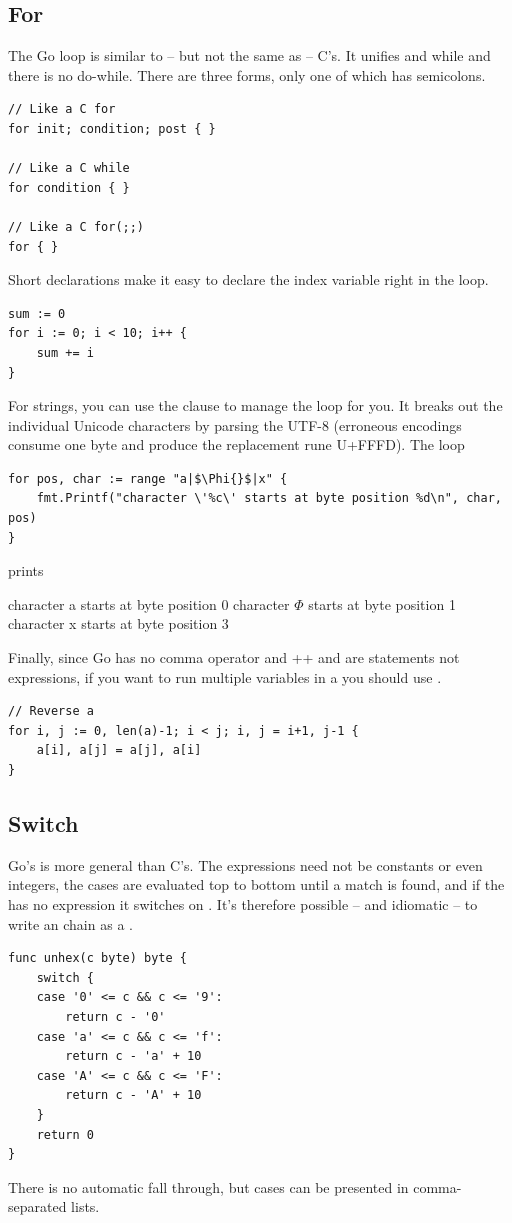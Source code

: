 \subsection{For}
The Go  loop is similar to -- but not the same as -- C's. It
unifies 
and while and there is no do-while. There are three forms, only one of
which has semicolons.
\begin{lstlisting}
// Like a C for
for init; condition; post { }

// Like a C while
for condition { }

// Like a C for(;;)
for { }
\end{lstlisting}
Short declarations make it easy to declare the index variable right in the loop.
\begin{lstlisting}
sum := 0
for i := 0; i < 10; i++ {
    sum += i
}
\end{lstlisting}
For strings, you can use the  clause to manage the loop for
you. It breaks out the individual Unicode characters by parsing the UTF-8 (erroneous encodings consume one
byte and produce the replacement rune U+FFFD). The loop

\begin{lstlisting}
for pos, char := range "a|$\Phi{}$|x" {
    fmt.Printf("character \'%c\' starts at byte position %d\n", char, pos)
}
\end{lstlisting}
prints
\begin{display}
character a starts at byte position 0
character \begin{math}\Phi\end{math} starts at byte position 1
character x starts at byte position 3
\end{display}
Finally, since Go has no comma operator and ++ and \-\- are statements not
expressions, if you want to run multiple variables in a  you should
use .
\begin{lstlisting}
// Reverse a
for i, j := 0, len(a)-1; i < j; i, j = i+1, j-1 {
    a[i], a[j] = a[j], a[i]
}
\end{lstlisting}

\subsection{Switch}
Go's  is more general than C's. The expressions need not be
constants or even integers, the cases are evaluated top to bottom until
a match is found, and if the  has no expression it switches on
. It's therefore possible -- and idiomatic -- to write an
 chain as a .
\begin{lstlisting}
func unhex(c byte) byte {
    switch {
    case '0' <= c && c <= '9':
        return c - '0'
    case 'a' <= c && c <= 'f':
        return c - 'a' + 10
    case 'A' <= c && c <= 'F':
        return c - 'A' + 10
    }
    return 0
}
\end{lstlisting}
There is no automatic fall through, but cases can be presented in comma-separated lists.

